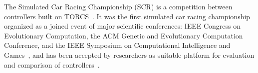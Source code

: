 





The Simulated Car Racing Championship (SCR) is a competition between controllers built on TORCS~\cite{SCR}. It was the first simulated car racing championship organized as a joined event of major scientific conferences: IEEE Congress on Evolutionary Computation, the ACM Genetic and Evolutionary Computation Conference, and the IEEE Symposium on Computational Intelligence and Games~\cite{2009}, and has been accepted by researchers as suitable platform for evaluation and comparison of controllers~\cite{SIMUTORCS}.

